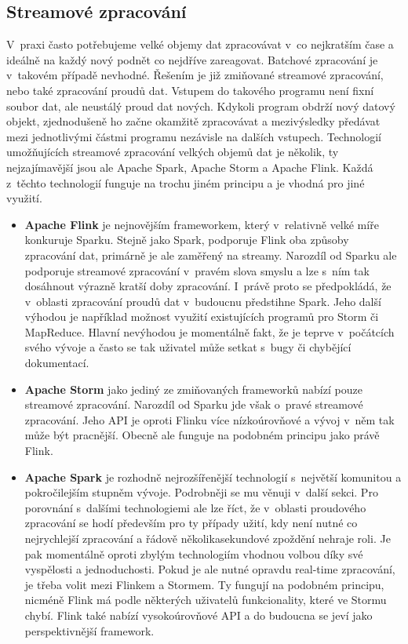 \documentclass[thesis=B,czech]{FITthesis}[2012/06/26]
\begin{document}
\subsection{Streamové zpracování}
	V~praxi často potřebujeme velké objemy dat zpracovávat v~co nejkratším čase a ideálně na každý nový podnět co nejdříve zareagovat. Batchové zpracování je v~takovém případě nevhodné. Řešením je již zmiňované streamové zpracování, nebo také zpracování proudů dat. Vstupem do takového programu není fixní soubor dat, ale neustálý proud dat nových. Kdykoli program obdrží nový datový objekt, zjednodušeně ho začne okamžitě zpracovávat a mezivýsledky předávat mezi jednotlivými částmi programu nezávisle na dalších vstupech. Technologií umožňujících streamové zpracování velkých objemů dat je několik, ty nejzajímavější jsou ale Apache Spark, Apache Storm a Apache Flink. Každá z~těchto technologií funguje na trochu jiném principu a je vhodná pro jiné využití. 
	
\begin{itemize}
\item \textbf{Apache Flink} je nejnovějším frameworkem, který v~relativně velké míře konkuruje Sparku. Stejně jako Spark, podporuje Flink oba způsoby zpracování dat, primárně je ale zaměřený na streamy. Narozdíl od Sparku ale podporuje streamové zpracování v~pravém slova smyslu a lze s~ním tak dosáhnout výrazně kratší doby zpracování\cite{streaming-benchmark}. I~právě proto se předpokládá, že v~oblasti zpracování proudů dat v~budoucnu předstihne Spark\cite{flink-future}. Jeho další výhodou je například možnost využití existujících programů pro Storm či MapReduce. Hlavní nevýhodou je momentálně fakt, že je teprve v~počátcích svého vývoje a často se tak uživatel může setkat s~bugy či chybějící dokumentací. 
	
\item \textbf{Apache Storm} jako jediný ze zmiňovaných frameworků nabízí pouze streamové zpracování. Narozdíl od Sparku jde však o~pravé streamové zpracování. Jeho API je oproti Flinku více nízkoúrovňové a vývoj v~něm tak může být pracnější. Obecně ale funguje na podobném principu jako právě Flink. 
	
\item \textbf{Apache Spark} je rozhodně nejrozšířenější technologií s~největší komunitou a pokročilejším stupněm vývoje. Podrobněji se mu věnuji v~další sekci. Pro porovnání s~dalšími technologiemi ale lze říct, že v~oblasti proudového zpracování se hodí především pro ty případy užití, kdy není nutné co nejrychlejší zpracování a řádově několikasekundové zpoždění nehraje roli. Je pak momentálně oproti zbylým technologiím vhodnou volbou díky své vyspělosti a jednoduchosti. Pokud je ale nutné opravdu real-time zpracování, je třeba volit mezi Flinkem a Stormem. Ty fungují na podobném principu, nicméně Flink má podle některých uživatelů funkcionality, které ve Stormu chybí\cite{so-flink-storm}. Flink také nabízí vysokoúrovňové API a do budoucna se jeví jako perspektivnější framework. 
\end{itemize}		
	
\end{document}
